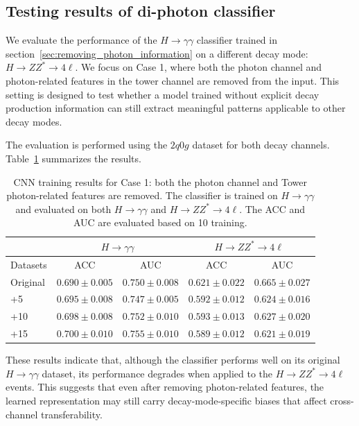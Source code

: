 \documentclass[12pt]{article}
\begin{document}
    \subsection{Testing results of di-photon classifier}%
    \label{sub:testing_results_of_di_photon_classifier}
        We evaluate the performance of the $H \to \gamma\gamma$ classifier trained in section~\ref{sec:removing_photon_information} on a different decay mode: $H \to ZZ^* \to 4\ell$. We focus on Case 1, where both the photon channel and photon-related features in the tower channel are removed from the input. This setting is designed to test whether a model trained without explicit decay production information can still extract meaningful patterns applicable to other decay modes.

        The evaluation is performed using the $2q0g$ dataset for both decay channels. Table~\ref{tab:CWoLa_CNN_training_results_3000_jet_tagging_eta_phi_aug_5_10_15_remove_photon_ZZ4l} summarizes the results.
        \begin{table}[htpb]
            \centering
            \caption{CNN training results for Case 1: both the photon channel and Tower photon-related features are removed. The classifier is trained on $H \to \gamma\gamma$ and evaluated on both $H \to \gamma\gamma$ and $H \to ZZ^* \to 4\ell$. The ACC and AUC are evaluated based on 10 training.}
            \label{tab:CWoLa_CNN_training_results_3000_jet_tagging_eta_phi_aug_5_10_15_remove_photon_ZZ4l}
            \begin{tabular}{l|cc|cc}
                         & \multicolumn{2}{c|}{$H\to\gamma\gamma$}      & \multicolumn{2}{c}{$H\to ZZ^*\to 4\ell$}           \\ \hline
                Datasets & ACC               & AUC               & ACC               & AUC               \\ \hline
                Original & $0.690 \pm 0.005$ & $0.750 \pm 0.008$ & $0.621 \pm 0.022$ & $0.665 \pm 0.027$ \\
                +5       & $0.695 \pm 0.008$ & $0.747 \pm 0.005$ & $0.592 \pm 0.012$ & $0.624 \pm 0.016$ \\
                +10      & $0.698 \pm 0.008$ & $0.752 \pm 0.010$ & $0.593 \pm 0.013$ & $0.627 \pm 0.020$ \\
                +15      & $0.700 \pm 0.010$ & $0.755 \pm 0.010$ & $0.589 \pm 0.012$ & $0.621 \pm 0.019$
            \end{tabular}
        \end{table}
        These results indicate that, although the classifier performs well on its original $H \to \gamma\gamma$ dataset, its performance degrades when applied to the $ H\to ZZ^* \to 4\ell$ events. This suggests that even after removing photon-related features, the learned representation may still carry decay-mode-specific biases that affect cross-channel transferability.




\end{document}
